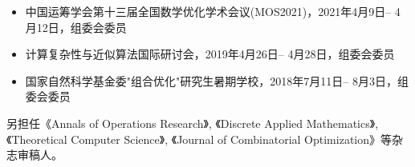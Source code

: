 %
%


{
\fontsize{9.5pt}{\baselineskip}\selectfont

\begin{itemize}[leftmargin=*]
	\item 中国运筹学会第十三届全国数学优化学术会议(MOS2021)，2021年4月9日-- 4月12日，组委会委员
	\item 计算复杂性与近似算法国际研讨会，2019年4月26日-- 4月28日，组委会委员
	\item 国家自然科学基金委"组合优化"研究生暑期学校，2018年7月11日-- 8月3日，组委会委员
\end{itemize}

另担任《Annals of Operations Research》, 《Discrete Applied Mathematics》, 《Theoretical Computer Science》, 《Journal of Combinatorial Optimization》等杂志审稿人。
}